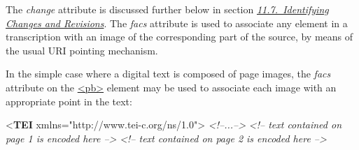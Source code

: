  The {\itshape change} attribute is discussed further below in section \textit{\hyperref[PH-changes]{11.7.\ Identifying Changes and Revisions}}. The {\itshape facs} attribute is used to associate any element in a transcription with an image of the corresponding part of the source, by means of the usual URI pointing mechanism. \par
In the simple case where a digital text is composed of page images, the {\itshape facs} attribute on the \hyperref[TEI.pb]{<pb>} element may be used to associate each image with an appropriate point in the text: \par\bgroup{}\exampleFont \begin{shaded}\noindent\mbox{}{<\textbf{TEI} xmlns="http://www.tei-c.org/ns/1.0">}\mbox{}\newline 
{}\mbox{}\newline 
\textit{<!--...-->}\mbox{}\newline 
{}\mbox{}\newline 
{}\mbox{}\newline 
\hspace*{1em}\mbox{}\newline 
\textit{<!-- text contained on page 1 is encoded here -->}\mbox{}\newline 
\hspace*{1em}\mbox{}\newline 
\textit{<!-- text contained on page 2 is encoded here -->}\mbox{}\newline 
{}\mbox{}\newline 

\end{shaded}
